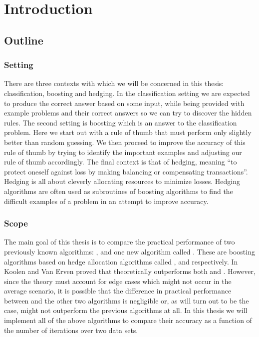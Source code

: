 
\chapter{Introduction}
\label{chap:intro}

\section{Outline}
\subsection{Setting}
There are three contexts with which we will be concerned in this thesis: classification, boosting and hedging.
In the classification setting we are expected to produce the correct answer based on some input, while being provided with example problems and their correct answers so we can try to discover the hidden rules. The second setting is boosting which is an answer to the classification problem. Here we start out with a rule of thumb that must perform only slightly better than random guessing. We then proceed to improve the accuracy of this rule of thumb by trying to identify the important examples and adjusting our rule of thumb accordingly. The final context is that of hedging, meaning ``to protect oneself against loss by making balancing or compensating transactions''. Hedging is all about cleverly allocating resources to minimize losses. Hedging algorithms are often used as subroutines of boosting algorithms to find the difficult examples of a problem in an attempt to improve accuracy.

\subsection{Scope}

The main goal of this thesis is to compare the practical performance of two previously known algorithms: \adaB, \NHB and one new algorithm called \squintB. These are boosting algorithms based on hedge allocation algorithms called \hedge, \adaN and \squint respectively. In \cite{Koolen2015} Koolen and Van Erven proved that \squint theoretically outperforms both \hedge and \adaN. However, since the theory must account for edge cases which might not occur in the average scenario, it is possible that the difference in practical performance between \squint and the other two algorithms is negligible or, as will turn out to be the case, \squintB might not outperform the previous algorithms at all. In this thesis we will implement all of the above algorithms to compare their accuracy as a function of the number of iterations over two data sets.


